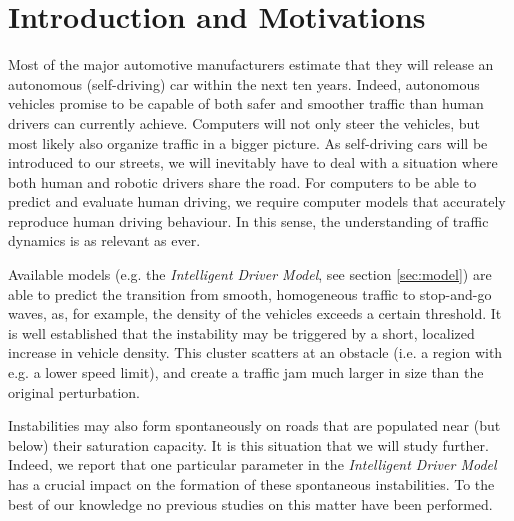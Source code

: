 \section{Introduction and Motivations}
Most of the major automotive manufacturers estimate that they will release an autonomous (self-driving) car within the next ten years. Indeed, autonomous vehicles promise to be capable of both safer and smoother traffic than human drivers can currently achieve. Computers will not only steer the vehicles, but most likely also organize traffic in a bigger picture. As self-driving cars will be introduced to our streets, we will inevitably have to deal with a situation where both human and robotic drivers share the road. For computers to be able to predict and evaluate human driving, we require computer models that accurately reproduce human driving behaviour. In this sense, the understanding of traffic dynamics is as relevant as ever.

Available models (e.g. the \emph{Intelligent Driver Model}, see section \ref{sec:model}) are able to predict the transition from smooth, homogeneous traffic to stop-and-go waves, as, for example, the density of the vehicles exceeds a certain threshold. It is well established \cite{treiber1999, treiber2000, treiber2013} that the instability may be triggered by a short, localized increase in vehicle density. This cluster scatters at an obstacle (i.e. a region with e.g. a lower speed limit), and create a traffic jam much larger in size than the original perturbation.

Instabilities may also form spontaneously on roads that are populated near (but below) their saturation capacity. It is this situation that we will study further. Indeed, we report that one particular parameter in the \emph{Intelligent Driver Model} has a crucial impact on the formation of these spontaneous instabilities. To the best of our knowledge no previous studies on this matter have been performed.

